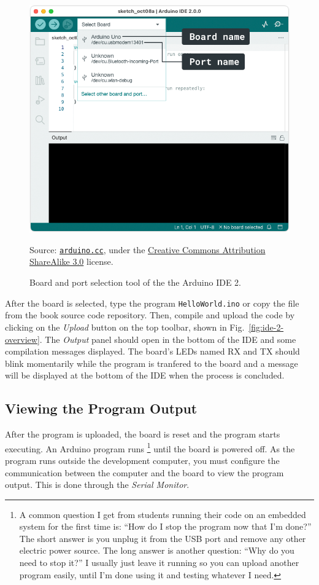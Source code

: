 \begin{figure}[b]
  \centering
  \includegraphics[width=\textwidth]{img/board-selector-labels}%
  \\ \scriptsize
  \raggedright
  Source: \href{https://support.arduino.cc/hc/en-us/articles/4406856349970-Select-board-and-port-in-Arduino-IDE}{\texttt{arduino.cc}}, under the \href{https://creativecommons.org/licenses/by-sa/3.0/legalcode}{Creative Commons Attribution ShareAlike 3.0} license.
  \caption{Board and port selection tool of the the Arduino IDE 2.}
  \label{fig:board-selector-labels}
\end{figure}

After the board is selected, type the program \texttt{HelloWorld.ino} or copy the file from the book source code repository.
Then, compile and upload the code by clicking on the \emph{Upload} button on the top toolbar, shown in Fig.~\ref{fig:ide-2-overview}.
The \emph{Output} panel should open in the bottom of the IDE and some compilation messages displayed.
The board's LEDs named RX and TX should blink momentarily while the program is tranfered to the board and a message will be displayed at the bottom of the IDE when the process is concluded.

\subsection{Viewing the Program Output}
After the program is uploaded, the board is reset and the program starts executing.
An Arduino program runs%
\footnote{%
  A common question I get from students running their code on an embedded system for the first time is: ``How do I stop the program now that I'm done?''
  The short answer is you unplug it from the USB port and remove any other electric power source.
  The long answer is another question: ``Why do you need to stop it?'' I usually just leave it running so you can upload another program easily, until I'm done using it and testing whatever I need.%
}
until the board is powered off.
As the program runs outside the development computer, you must configure the communication between the computer and the board to view the program output.
This is done through the \emph{Serial Monitor}.

